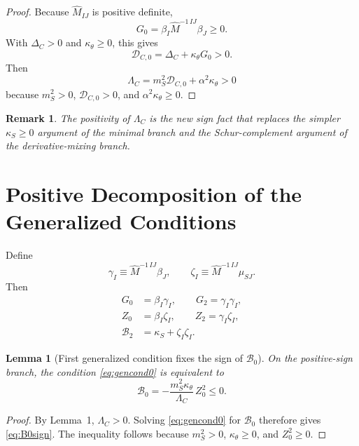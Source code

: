 \documentclass[11pt]{article}
\newtheorem{lemma}{Lemma}
\newtheorem{remark}{Remark}
\begin{document}
\begin{proof}
Because \(\widehat M_{IJ}\) is positive definite,
\[
G_0=\beta_I\widehat M^{-1\,IJ}\beta_J\ge 0.
\]
With \(\Delta_C>0\) and \(\kappa_\theta\ge 0\), this gives
\[
\mathcal D_{C,0}=\Delta_C+\kappa_\theta G_0>0.
\]
Then
\[
\Lambda_C=m_S^2\mathcal D_{C,0}+\alpha^2\kappa_\theta>0
\]
because \(m_S^2>0\), \(\mathcal D_{C,0}>0\), and \(\alpha^2\kappa_\theta\ge 0\).
\end{proof}

\begin{remark}
The positivity of \(\Lambda_C\) is the new sign fact that replaces the simpler \(\kappa_S\ge 0\) argument of the minimal branch and the Schur-complement argument of the derivative-mixing branch.
\end{remark}

\section{Positive Decomposition of the Generalized Conditions}

Define
\begin{equation}
\gamma_I\equiv \widehat M^{-1\,IJ}\beta_J,
\qquad
\zeta_I\equiv \widehat M^{-1\,IJ}\mu_{SJ}.
\label{eq:gammazeta}
\end{equation}
Then
\begin{align}
G_0&=\beta_I\gamma_I,
\qquad
G_2=\gamma_I\gamma_I,
\label{eq:Ggamma}
\\
Z_0&=\beta_I\zeta_I,
\qquad
Z_2=\gamma_I\zeta_I,
\label{eq:Zgamma}
\\
\mathcal B_2&=\kappa_S+\zeta_I\zeta_I.
\label{eq:B2zeta}
\end{align}

\begin{lemma}[First generalized condition fixes the sign of \(\mathcal B_0\)]
On the positive-sign branch, the condition \eqref{eq:gencond0} is equivalent to
\begin{equation}
\mathcal B_0
=
-\frac{m_S^2\kappa_\theta}{\Lambda_C}\,Z_0^2
\le 0.
\label{eq:B0sign}
\end{equation}
\end{lemma}

\begin{proof}
By Lemma~1, \(\Lambda_C>0\). Solving \eqref{eq:gencond0} for \(\mathcal B_0\) therefore gives \eqref{eq:B0sign}. The inequality follows because \(m_S^2>0\), \(\kappa_\theta\ge 0\), and \(Z_0^2\ge 0\).
\end{proof}
\end{document}
